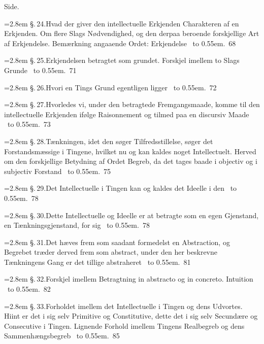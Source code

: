 \documentclass[12pt]{book}
\def\textit#1{#1}%
\newcommand{\ovside}{\par\nopagebreak\hfill{\footnotesize Side.}\par\nobreak\vspace{0.2\baselineskip}}
\newcommand{\ovline}[3]{%
  \par\vspace{0.25\baselineskip}%
  \noindent\hangindent=2.8em\hangafter=1
  \textit{\S.\,#1.}\quad #2%
  \nobreak\ \leaders\hbox to 0.55em{\hss.\hss}\hfill\ \textit{#3}\par}
\begin{document}
\ovside
\ovline{24}{Hvad der giver den intellectuelle Erkjenden Charakteren af en
  Erkjenden. Om flere Slags Nødvendighed, og den derpaa beroende forskjellige
  Art af Erkjendelse. Bemærkning angaaende Ordet: Erkjendelse}{68}
\ovline{25}{Erkjendelsen betragtet som grundet. Forskjel imellem to Slags
  Grunde}{71}
\ovline{26}{Hvori en Tings Grund egentligen ligger}{72}
\ovline{27}{Hvorledes vi, under den betragtede Fremgangsmaade, komme til den
  intellectuelle Erkjenden ifølge Raisonnement og tilmed paa en discursiv
  Maade}{73}
\ovline{28}{Tænkningen, idet den søger Tilfredsstillelse, søger det
  Forstandsmæssige i Tingene, hvilket nu og kan kaldes noget Intellectuelt.
  Herved om den forskjellige Betydning af Ordet Begreb, da det tages baade i
  objectiv og i subjectiv Forstand}{75}
\ovline{29}{Det Intellectuelle i Tingen kan og kaldes det Ideelle i den}{78}
\ovline{30}{Dette Intellectuelle og Ideelle er at betragte som en egen
  Gjenstand, en Tænkningsgjenstand, for sig}{78}
\ovline{31}{Det hæves frem som saadant formedelst en Abstraction, og Begrebet
  træder derved frem som abstract, under den her beskrevne Tænkningens Gang er
  det tillige abstraheret}{81}
\ovline{32}{Forskjel imellem Betragtning \textit{in abstracto} og
  \textit{in concreto}. Intuition}{82}
\ovline{33}{Forholdet imellem det Intellectuelle i Tingen og dens Udvortes.
  Hiint er det i sig selv Primitive og Constitutive, dette det i sig selv
  Secundære og Consecutive i Tingen. Lignende Forhold imellem Tingens
  Realbegreb og dens Sammenhængsbegreb}{85}
\end{document}
